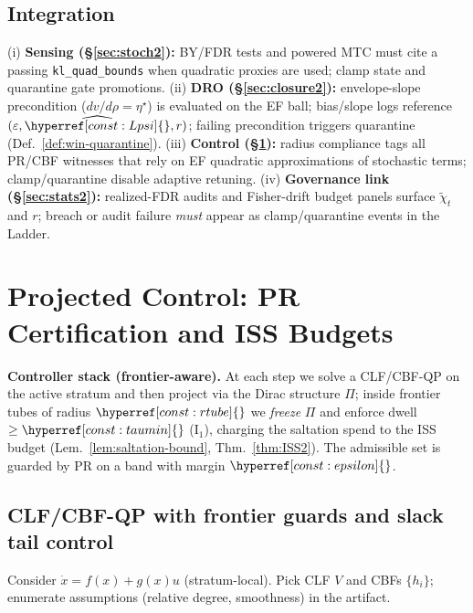 \documentclass[10pt]{article}
\newcommand{\constref}[1]{\hyperref[const:#1]{\ensuremath{\csname constsym#1\endcsname}}}
\begin{document}
\subsection*{Integration}
\noindent
(i) \textbf{Sensing (\S\ref{sec:stoch2}):} BY/FDR tests and powered MTC must cite a passing \texttt{kl\_quad\_bounds} when quadratic proxies are used; clamp state and quarantine gate promotions.
(ii) \textbf{DRO (\S\ref{sec:closure2}):} envelope-slope precondition (\(dv/d\rho=\eta^\star\)) is evaluated on the EF ball; bias/slope logs reference $(\varepsilon,\widehat{\constref{Lpsi}},r)$; failing precondition triggers quarantine (Def.~\ref{def:win-quarantine}).
(iii) \textbf{Control (\S\ref{sec:ctrl2}):} radius compliance tags all PR/CBF witnesses that rely on EF quadratic approximations of stochastic terms; clamp/quarantine disable adaptive retuning.
(iv) \textbf{Governance link (\S\ref{sec:stats2}):} realized-FDR audits and Fisher-drift budget panels surface $\tilde\chi_t$ and $r$; breach or audit failure \emph{must} appear as clamp/quarantine events in the Ladder.

\section{Projected Control: PR Certification and ISS Budgets}\label{sec:ctrl2}

\noindent\textbf{Controller stack (frontier-aware).}
At each step we solve a CLF/CBF-QP on the active stratum and then project via the Dirac structure $\Pi$; inside frontier tubes of radius $\constref{rtube}$ we \emph{freeze} $\Pi$ and enforce dwell $\ge\constref{taumin}$ (I$_1$), charging the saltation spend to the ISS budget (Lem.~\ref{lem:saltation-bound}, Thm.~\ref{thm:ISS2}). The admissible set is guarded by PR on a band with margin $\constref{epsilon}$.

\subsection*{CLF/CBF-QP with frontier guards and slack tail control}
Consider $\dot x=f(x)+g(x)u$ (stratum-local). Pick CLF $V$ and CBFs $\{h_i\}$; enumerate assumptions (relative degree, smoothness) in the artifact.
\end{document}
